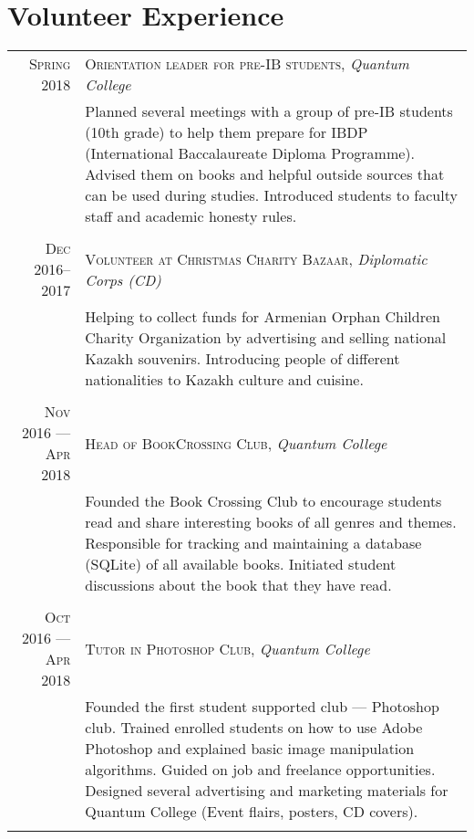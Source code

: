\documentclass[a4paper,10pt]{article}
\begin{document}
\section{Volunteer Experience}
\begin{tabular}{r|p{11cm}}

\textsc{Spring 2018} &  \textsc{Orientation leader for pre-IB students}, \emph{Quantum College}\\&\footnotesize{Planned several meetings with a group of pre-IB students (10th grade) to help them prepare for IBDP (International Baccalaureate Diploma Programme). Advised them on books and helpful outside sources that can be used during studies. Introduced students to faculty staff and academic honesty rules.} \\\multicolumn{2}{c}{}\\
  
  \textsc{Dec 2016--2017} &  \textsc{Volunteer at Christmas Charity Bazaar}, \emph{Diplomatic Corps (CD)}\\&\footnotesize{Helping to collect funds for Armenian Orphan Children Charity Organization by advertising and selling national Kazakh souvenirs. Introducing people of different nationalities to Kazakh culture and cuisine.} \\\multicolumn{2}{c}{}\\

\textsc{Nov 2016 --- Apr 2018} &  \textsc{Head of BookCrossing Club}, \emph{Quantum College}\\&\footnotesize{Founded the Book Crossing Club to encourage students read and share interesting books of all genres and themes. Responsible for tracking and maintaining a database (SQLite) of all available books. Initiated student discussions about the book that they have read.} \\\multicolumn{2}{c}{}\\

\textsc{Oct 2016 --- Apr 2018} &  \textsc{Tutor in Photoshop Club}, \emph{Quantum College}\\&\footnotesize{Founded the first student supported club --- Photoshop club. Trained enrolled students on how to use Adobe Photoshop and explained basic image manipulation algorithms. Guided on job and freelance opportunities. Designed several advertising and marketing materials for Quantum College (Event flairs, posters, CD covers).} \\\multicolumn{2}{c}{}\\
  
\end{tabular}
\end{document}
